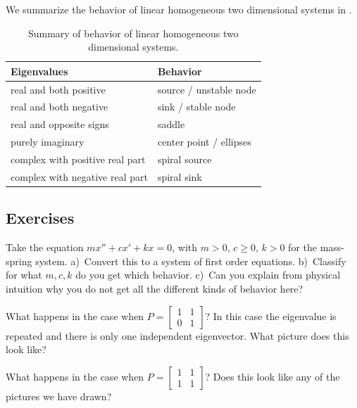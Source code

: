 \documentclass[12pt]{book}
\begin{document}
\medskip

We summarize the behavior of linear homogeneous two dimensional systems
in .

\begin{table}[h!t]
\capstart
\begin{center}
\begin{tabular}{@{}ll@{}}
\toprule
Eigenvalues & Behavior \\
\midrule
real and both positive & source / unstable node \\
real and both negative & sink / stable node \\
real and opposite signs & saddle \\
purely imaginary & center point / ellipses \\
complex with positive real part & spiral source \\
complex with negative real part & spiral sink \\
\bottomrule
\end{tabular}
\end{center}
\caption{Summary of behavior of linear homogeneous two dimensional systems.\label{pln:behtab}}
\end{table}

\subsection{Exercises}

\begin{exercise}
Take the equation $m x'' + c x' + kx = 0$, with $m > 0$, $c \geq 0$, $k > 0$
for the mass-spring system.  a)~Convert this to a system of first
order equations.  b)~Classify for what $m, c, k$ do you get which behavior.
c)~Can you explain from physical intuition why you do not get all the
different kinds of behavior here?
\end{exercise}

\begin{exercise}
What happens in the case when $P = 
\left[ \begin{smallmatrix} 1 & 1 \\ 0 & 1 \end{smallmatrix} \right]$?  In
this case the eigenvalue is repeated and there is only one independent eigenvector.
What
picture does this look like?
\end{exercise}

\begin{exercise}
What happens in the case when $P = 
\left[ \begin{smallmatrix} 1 & 1 \\ 1 & 1 \end{smallmatrix} \right]$?
Does this look like any of the pictures we have drawn?
\end{exercise}
\end{document}
